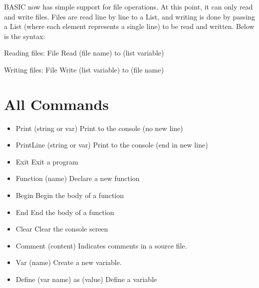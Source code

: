 \documentclass{report}
\begin{document}
BASIC now has simple support for file operations. At this point, it can only read and write files. Files are read line by line to a List, and writing is done by passing a List (where each element represents a single line) to be read and written. Below is the syntax:

Reading files:
File Read (file name) to (list variable)

Writing files:
File Write (list variable) to (file name)

\chapter{All Commands}

\begin{itemize}
\item{Print (string or var)}\newline
Print to the console (no new line)

\item{PrintLine (string or var)}\newline
Print to the console (end in new line)

\item{Exit}\newline
Exit a program

\item{Function (name)}\newline
Declare a new function

\item{Begin}\newline
Begin the body of a function

\item{End}\newline
End the body of a function

\item{Clear}\newline
Clear the console screen

\item{Comment (content)}\newline
Indicates comments in a source file.

\item{Var (name)}\newline
Create a new variable.

\item{Define (var name) as (value)}\newline
Define a variable


\end{itemize}
\end{document}
